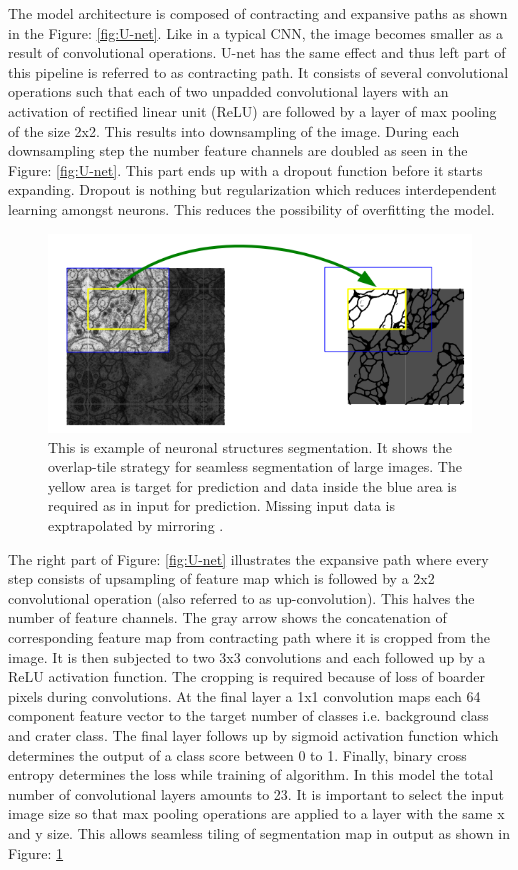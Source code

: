 \documentclass[11pt]{article}
\begin{document}
The model architecture is composed of contracting and expansive paths as shown in the Figure: \ref{fig:U-net}. Like in a typical CNN, the image becomes smaller as a result of convolutional operations. U-net has the same effect and thus left part of this pipeline is referred to as contracting path. It consists of several convolutional operations such that each of two unpadded convolutional layers with an activation of rectified linear unit (ReLU) are followed by a layer of max pooling of the size 2x2. This results into downsampling of the image. During each downsampling step the number feature channels are doubled as seen in the Figure: \ref{fig:U-net}. This part ends up with a dropout function before it starts expanding. Dropout is nothing but regularization which reduces interdependent learning amongst neurons. This reduces the possibility of overfitting the model.

\begin{figure}[H]
	\centering
	\includegraphics[width=.6\linewidth]{files/unet/tile.png}
	\caption{This is example of neuronal structures segmentation. It shows the overlap-tile strategy for seamless segmentation of large images. The yellow area is target for prediction and data inside the blue area is required as in input for prediction. Missing input data is exptrapolated by mirroring \cite{ronneberger2015u}.}
	\label{fig:tiling}
\end{figure} 

The right part of Figure: \ref{fig:U-net} illustrates the expansive path where every step consists of upsampling of feature map which is followed by a 2x2 convolutional operation (also referred to as up-convolution). This halves the number of feature channels. The gray arrow shows the concatenation of corresponding feature map from contracting path where it is cropped from the image. It is then subjected to two 3x3 convolutions and each followed up by a ReLU activation function. The cropping is required because of loss of boarder pixels during convolutions. At the final layer a 1x1 convolution maps each 64 component feature vector to the target number of classes i.e. background class and crater class. The final layer follows up by sigmoid activation function which determines the output of a class score between 0 to 1. Finally, binary cross entropy determines the loss while training of algorithm. In this model the total number of convolutional layers amounts to 23. It is important to select the input image size so that max pooling operations are applied to a layer with the same x and y size. This allows seamless tiling of segmentation map in output as shown in Figure: \ref{fig:tiling}
\end{document}
